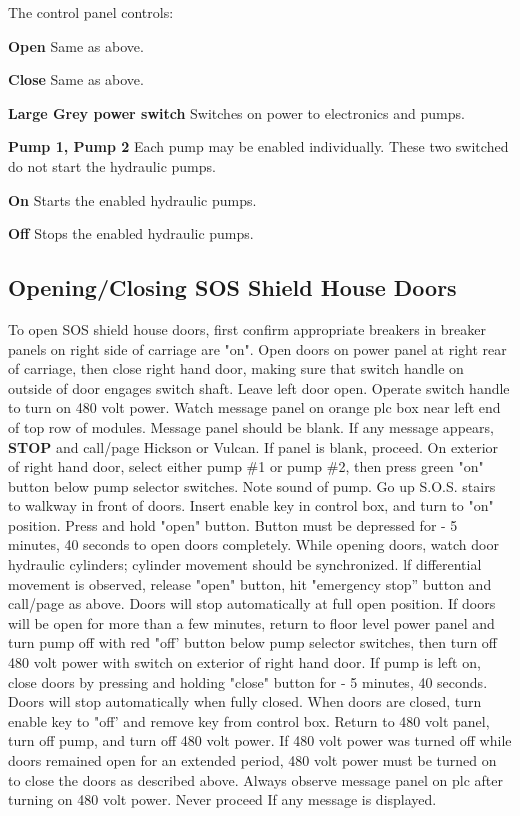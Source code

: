 The control panel controls:

\begin{description}
\item{\bf Open} Same as above.
\item{\bf Close} Same as above.
\item{\bf Large Grey power switch} Switches on power to electronics and pumps.
\item{\bf Pump 1, Pump 2} Each pump may be enabled individually. These two
switched do not start the hydraulic pumps.
\item{\bf On} Starts the enabled hydraulic pumps.
\item{\bf Off} Stops the enabled hydraulic pumps.
\end{description}

\subsection{Opening/Closing SOS Shield House Doors}

To open SOS shield house doors, first confirm appropriate breakers in
breaker panels on right side of carriage are "on". Open doors on power
panel at right rear of carriage, then close right hand door, making sure
that switch handle on outside of door engages switch shaft. Leave left door
open.
Operate switch handle to turn on 480 volt power. Watch message panel on
orange plc box near left end of top row of modules. Message panel should be
blank. If any message appears, {\bf STOP} and call/page Hickson or
Vulcan.  If panel is
blank, proceed. On exterior of right hand door, select either pump \#1 or
pump \#2, then press green "on" button below pump selector switches. Note
sound of pump. Go up S.O.S. stairs to walkway in front of doors. Insert
enable key in control box, and turn to "on" position. Press and hold "open"
button. Button must be depressed for - 5 minutes, 40 seconds to open doors
completely. While opening doors, watch door hydraulic cylinders; cylinder
movement should be synchronized. lf differential movement is observed,
release "open" button, hit "emergency stop'' button and call/page as 
above.  Doors will stop automatically at full open position.
If doors will be open for more than a few minutes, return to floor level
power panel and turn pump off with red "off' button below pump selector
switches, then turn off 480 volt power with switch on exterior of right
hand door. If pump is left on, close doors by pressing and holding "close"
button for - 5 minutes, 40 seconds. Doors will stop automatically when
fully closed.  When doors are closed, turn enable key to "off' and remove
key from control box. Return to 480 volt panel, turn off pump, and turn off
480 volt power. If 480 volt power was turned off while doors remained open
for an extended period, 480 volt power must be turned on to close the doors
as described above. Always observe message panel on plc after turning on
480 volt power. Never proceed If any message is displayed.

